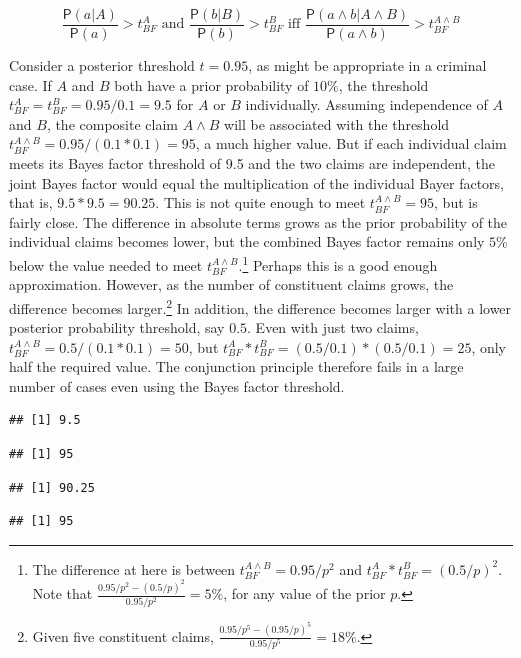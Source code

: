 \documentclass[10pt,dvipsnames,enabledeprecatedfontcommands]{scrartcl}
\newcommand{\et}{\wedge}
\newcommand{\pr}[1]{\mathsf{P}(#1)}
\begin{document}
\[  \text{ $\frac{\pr{a | A }}{\pr{a}}>t^A_{BF}$ and $\frac{\pr{ b | B}}{\pr{b}}>t^B_{BF}$ iff $\frac{\pr{a \et b | A \et B}}{\pr{a \et b}}>t^{A\wedge B}_{BF}$ } \]

\noindent Consider a posterior threshold \(t=0.95\), as might be
appropriate in a criminal case. If \(A\) and \(B\) both have a prior
probability of \(10\%\), the threshold
\(t^A_{BF}=t_{BF}^B=0.95/0.1=9.5\) for \(A\) or \(B\) individually.
Assuming independence of \(A\) and \(B\), the composite claim
\(A \wedge B\) will be associated with the threshold
\(t^{A\wedge B}_{BF}=0.95/(0.1*0.1)=95\), a much higher value. But if
each individual claim meets its Bayes factor threshold of 9.5 and the
two claims are independent, the joint Bayes factor would equal the
multiplication of the individual Bayer factors, that is,
\(9.5*9.5=90.25\). This is not quite enough to meet
\(t^{A\wedge B}_{BF}=95\), but is fairly close. The difference in
absolute terms grows as the prior probability of the individual claims
becomes lower, but the combined Bayes factor remains only \(5\%\) below
the value needed to meet
\(t_{BF}^{A\wedge B}\).\footnote{The difference at here is between $t_{BF}^{A\wedge B}=0.95/p^2$ and $t_{BF}^{A}*t_{BF}^{B}=(0.5/p)^{2}$. Note that $\frac{0.95/p^2 - (0.5/p)^{2}}{0.95/p^2}=5\%$, for any value of the prior $p$.}
Perhaps this is a good enough approximation. However, as the number of
constituent claims grows, the difference becomes
larger.\footnote{Given five constituent claims, $\frac{0.95/p^5 - (0.95/p)^{5}}{0.95/p^5}=18\%$.}
In addition, the difference becomes larger with a lower posterior
probability threshold, say \(0.5\). Even with just two claims,
\(t^{A\wedge B}_{BF}=0.5/(0.1*0.1)=50\), but
\(t^A_{BF}*t_{BF}^B=(0.5/0.1)*(0.5/0.1)=25\), only half the required
value. The conjunction principle therefore fails in a large number of
cases even using the Bayes factor threshold.

\begin{verbatim}
## [1] 9.5
\end{verbatim}

\begin{verbatim}
## [1] 95
\end{verbatim}

\begin{verbatim}
## [1] 90.25
\end{verbatim}

\begin{verbatim}
## [1] 95
\end{verbatim}
\end{document}
